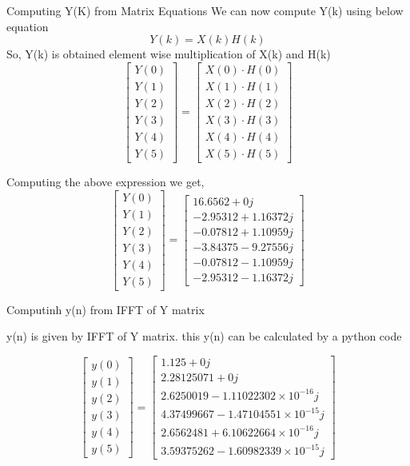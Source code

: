 \documentclass[english,10pt]{beamer}
\begin{document}
{\begin{frame}{Computing Y(K) from Matrix Equations}
We can now compute Y(k) using below equation
   \[ Y(k) = X(k)H(k)\]
So, Y(k) is obtained element wise multiplication of X(k) and H(k)
\[\begin{bmatrix} 
Y(0) \\ Y(1) \\ Y(2) \\ Y(3) \\ Y(4) \\ Y(5) 
\end{bmatrix}
=
\begin{bmatrix}
X(0)\cdot H(0) \\ X(1)\cdot H(1) \\ X(2)\cdot H(2) \\ X(3)\cdot H(3) \\ X(4)\cdot H(4) \\ X(5)\cdot H(5)
\end{bmatrix}\]

Computing the above expression we get,
 \[
\begin{bmatrix} 
Y(0) \\ Y(1) \\ Y(2) \\ Y(3) \\ Y(4) \\ Y(5) 
\end{bmatrix}
=
\begin{bmatrix}
16.6562+0j \\ -2.95312+1.16372j \\ -0.07812+1.10959j \\ -3.84375-9.27556j \\ -0.07812-1.10959j \\ -2.95312-1.16372j 
\end{bmatrix}\]


\end{frame}
\begin{frame}{Computinh y(n) from IFFT of Y matrix}
   
y(n) is given by IFFT of Y matrix. this y(n) can be calculated by a python code 

\[
    \begin{bmatrix} 
y(0) \\ y(1) \\ y(2) \\ y(3) \\ y(4) \\ y(5) 
\end{bmatrix}
=
\begin{bmatrix}
1.125     +0j \\ 2.28125071+0j \\ 2.6250019 -1.11022302 \times 10^{-16}j \\ 4.37499667-1.47104551\times 10^{-15}j \\ 2.6562481 +6.10622664 \times 10^{-16}j \\ 3.59375262-1.60982339 \times 10^{-15}j 
\end{bmatrix}
\]
\end{frame}
}
\end{document}
